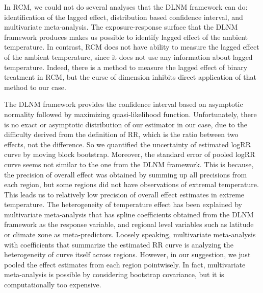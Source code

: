 \documentclass[12pt]{article}
\begin{document}
In RCM, we could not do several analyses that the DLNM framework can do:
identification of the lagged effect, 
distribution based confidence interval, and multivariate meta-analysis.
The exposure-response surface that the DLNM framework produces 
makes us possible to identify lagged effect of the ambient temperature.
In contrast, RCM does not have ability to measure the lagged effect of the ambient temperature,
since it does not use any information about lagged temperature.
Indeed, there is a method to measure the lagged effect of binary treatment in RCM\cite{bojinov2019},
but the curse of dimension inhibits direct application of that method to our case.

The DLNM framework provides the confidence interval based on asymptotic normality 
followed by maximizing quasi-likelihood function.
Unfortunately, there is no exact or asymptotic distribution of our estimator in our case,
due to the difficulty derived from the definition of RR, 
which is the ratio between two effects, not the difference.
So we quantified the uncertainty of estimated logRR curve by moving block bootstrap.
Moreover, the standard error of pooled logRR curve seems not similar to the one from the DLNM framework.
This is because,
the precision of overall effect was obtained by summing up all precisions from each region,
but some regions did not have observations of extremal temperature.
This leads us to relatively low precision of overall effect estimates in extreme temperature.
The heterogeneity of temperature effect has been explained by multivariate meta-analysis
that has spline coefficients obtained from the DLNM framework as the response variable, 
and regional level variables such as latitude or climate zone as meta-predictors.
Loosely speaking, multivariate meta-analysis with coefficients that summarize the estimated RR curve
is analyzing the heterogeneity of curve itself across regions.
However, in our suggestion, we just pooled the effect estimates from each region pointwisely.
In fact, multivariate meta-analysis is possible by considering bootstrap covariance,
but it is computationally too expensive.
\end{document}
